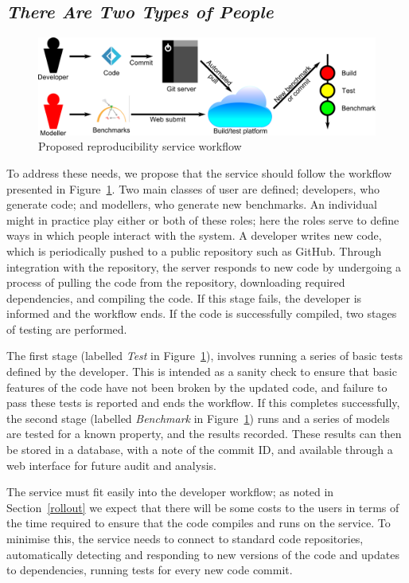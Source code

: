 \documentclass[conference]{IEEEtran}
\begin{document}
\subsection{{\emph{There Are Two Types of People}}}

\begin{figure}[!htp]
	\centering
	\includegraphics[width=\textwidth]{images/workflow}
	\caption{Proposed reproducibility service workflow}
	\label{schematic}
\end{figure}

To address these needs, we propose that the service should follow the
workflow presented in Figure~\ref{schematic}. Two main classes of user are
defined; developers, who generate code; and modellers, who generate
new benchmarks. An individual might in practice play either or both of
these roles; here the roles serve to define ways in which people
interact with the system. A developer writes new code, which is
periodically pushed to a public repository such as GitHub. Through
integration with the repository, the server responds to new code by
undergoing a process of pulling the code from the repository,
downloading required dependencies, and compiling the code. If this
stage fails, the developer is informed and the workflow ends. If the
code is successfully compiled, two stages of testing are
performed.

The first stage (labelled {\emph{Test}} in Figure~\ref{schematic}),
involves running a series of basic tests defined by the
developer. This is intended as a sanity check to ensure that basic
features of the code have not been broken by the updated code, and
failure to pass these tests is reported and ends the workflow. If this
completes successfully, the second stage (labelled {\emph{Benchmark}}
in Figure~\ref{schematic}) runs and a series of models are tested for
a known property, and the results recorded. These results can then be
stored in a database, with a note of the commit ID, and available
through a web interface for future audit and analysis.

The service must fit easily into the developer workflow; as noted in
Section~\ref{rollout} we expect that there will be some costs to the
users in terms of the time required to ensure that the code compiles
and runs on the service. To minimise this, the service needs to
connect to standard code repositories, automatically detecting and
responding to new versions of the code and updates to dependencies,
running tests for every new code commit.
\end{document}
